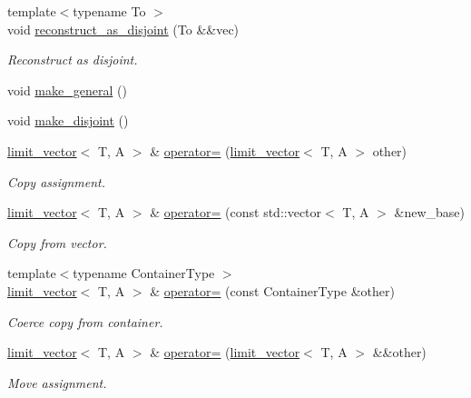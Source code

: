 \begin{DoxyCompactItemize}
\item 
{\footnotesize template$<$typename To $>$ }\\void \hyperlink{classIceBRG_1_1limit__vector_a27ec6eed7873706348a0b29b26d79ee5}{reconstruct\+\_\+as\+\_\+disjoint} (To \&\&vec)
\begin{DoxyCompactList}\small\item\em Reconstruct as disjoint. \end{DoxyCompactList}\item 
void \hyperlink{classIceBRG_1_1limit__vector_aa8eb9d4b25be0022ccea9e06bef3cb05}{make\+\_\+general} ()
\item 
void \hyperlink{classIceBRG_1_1limit__vector_a8328c477d791a4425a8461476d4b393f}{make\+\_\+disjoint} ()
\item 
\hyperlink{classIceBRG_1_1limit__vector}{limit\+\_\+vector}$<$ T, A $>$ \& \hyperlink{classIceBRG_1_1limit__vector_a3fece2b98d9b4b859d4d386976ff78c9}{operator=} (\hyperlink{classIceBRG_1_1limit__vector}{limit\+\_\+vector}$<$ T, A $>$ other)
\begin{DoxyCompactList}\small\item\em Copy assignment. \end{DoxyCompactList}\item 
\hyperlink{classIceBRG_1_1limit__vector}{limit\+\_\+vector}$<$ T, A $>$ \& \hyperlink{classIceBRG_1_1limit__vector_aab9b832c6156dbd4d7425be36894c71d}{operator=} (const std\+::vector$<$ T, A $>$ \&new\+\_\+base)
\begin{DoxyCompactList}\small\item\em Copy from vector. \end{DoxyCompactList}\item 
{\footnotesize template$<$typename Container\+Type $>$ }\\\hyperlink{classIceBRG_1_1limit__vector}{limit\+\_\+vector}$<$ T, A $>$ \& \hyperlink{classIceBRG_1_1limit__vector_ae49114008d4b1141d6911747283abc04}{operator=} (const Container\+Type \&other)
\begin{DoxyCompactList}\small\item\em Coerce copy from container. \end{DoxyCompactList}\item 
\hyperlink{classIceBRG_1_1limit__vector}{limit\+\_\+vector}$<$ T, A $>$ \& \hyperlink{classIceBRG_1_1limit__vector_a6c9ffe039efa71858e5aea175f8b9f7d}{operator=} (\hyperlink{classIceBRG_1_1limit__vector}{limit\+\_\+vector}$<$ T, A $>$ \&\&other)
\begin{DoxyCompactList}\small\item\em Move assignment. \end{DoxyCompactList}\item 

\end{DoxyCompactItemize}
